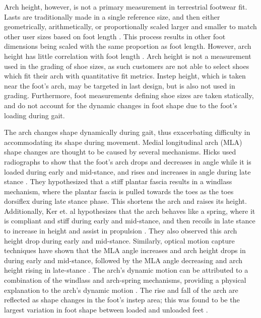 \documentclass[defaultstyle,11pt]{thesis}
\begin{document}
Arch height, however, is not a primary measurement in terrestrial footwear fit.
Lasts are traditionally made in a single reference size, and then either geometrically, arithmetically, or proportionally scaled larger and smaller to match other user sizes based on foot length \citep{Luximon2013}.
This process results in other foot dimensions being scaled with the same proportion as foot length.
However, arch height has little correlation with foot length \citep{Hill2017}.
Arch height is not a measurement used in the grading of shoe sizes, as such customers are not able to select shoes which fit their arch with quantitative fit metrics.
Instep height, which is taken near the foot's arch, may be targeted in last design, but is also not used in grading.
Furthermore, foot measurements defining shoe sizes are taken statically, and do not account for the dynamic changes in foot shape due to the foot's loading during gait.

The arch changes shape dynamically during gait, thus exacerbating difficulty in accommodating its shape during movement.
Medial longitudinal arch (MLA) shape changes are thought to be caused by several mechanisms.
Hicks used radiographs to show that the foot's arch drops and decreases in angle while it is loaded during early and mid-stance, and rises and increases in angle during late stance \citep{Hicks1954}.
They hypothesized that a stiff plantar fascia results in a windlass mechanism, where the plantar fascia is pulled towards the toes as the toes dorsiflex during late stance phase.
This shortens the arch and raises its height.
Additionally, Ker et. al hypothesizes that the arch behaves like a spring, where it is compliant and stiff during early and mid-stance, and then recoils in late stance to increase in height and assist in propulsion \citep{Ker1987}.
They also observed this arch height drop during early and mid-stance.
Similarly, optical motion capture techniques have shown that the MLA angle increases and arch height drops in during early and mid-stance, followed by the MLA angle decreasing and arch height rising in late-stance \citep{Caravaggi2010, Cashmere1999, Leardini2007, Stolwijk2014}.
The arch's dynamic motion can be attributed to a combination of the windlass and arch-spring mechanisms, providing a physical explanation to the arch's dynamic motion \citep{Welte2021, Welte2018}.
The rise and fall of the arch are reflected as shape changes in the foot's instep area; this was found to be the largest variation in foot shape between loaded and unloaded feet \citep{Schuster2021}.
\end{document}
